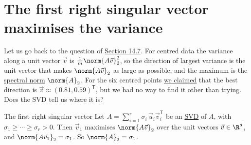 \documentclass[a4paper,12pt,oneside]{report}
\begin{document}
\section{The first right singular vector maximises the variance}
\label{sec:first-singular-vector}

Let us go back to the question of
\hyperref[sec:largest-variance]{Section 14.7}. For centred data the
variance along a unit vector $\vec v$ is
$\frac1m\norm{A\vec v}_2^2$, so the direction of largest variance is
the unit vector that makes $\norm{A\vec v}_2$ as large as possible,
and the maximum is the \hyperref[def:spectral-norm]{spectral norm}
$\norm{A}_2$. For the six centred points \hyperref[par:best-direction-six]{we claimed} that the best
direction is $\vec v\approx(0.81,0.59)^{\mathsf T}$, but we had no way
to find it other than trying. Does the SVD tell us where it is?

\begin{framedthm}{The first right singular vector}
\label{thm:first-singular-vector}
Let $A=\sum_{i=1}^{r}\sigma_i\,\vec u_i\vec v_i^{\mathsf T}$ be an
\hyperref[thm:svd]{SVD} of $A$, with
$\sigma_1\geq\cdots\geq\sigma_r>0$. Then $\vec v_1$ maximises
$\norm{A\vec v}_2$ over the unit vectors $\vec v\in\R^d$, and
$\norm{A\vec v_1}_2=\sigma_1$. So $\norm{A}_2=\sigma_1$.
\end{framedthm}
\end{document}
